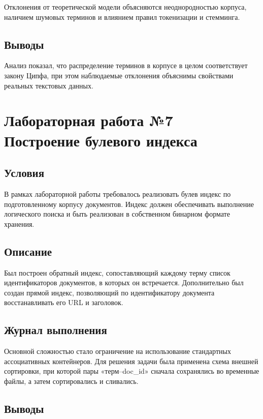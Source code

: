 \documentclass[12pt,a4paper]{article}
\begin{document}
Отклонения от теоретической модели объясняются неоднородностью корпуса, наличием шумовых терминов и влиянием правил токенизации и стемминга.

\subsection*{Выводы}

Анализ показал, что распределение терминов в корпусе в целом соответствует закону Ципфа, при этом наблюдаемые отклонения объяснимы свойствами реальных текстовых данных.

\newpage
\section*{Лабораторная работа №7\\
Построение булевого индекса}

\subsection*{Условия}

В рамках лабораторной работы требовалось реализовать булев индекс по подготовленному корпусу документов. Индекс должен обеспечивать выполнение логического поиска и быть реализован в собственном бинарном формате хранения.

\subsection*{Описание}

Был построен обратный индекс, сопоставляющий каждому терму список идентификаторов документов, в которых он встречается. Дополнительно был создан прямой индекс, позволяющий по идентификатору документа восстанавливать его URL и заголовок.

\subsection*{Журнал выполнения}

Основной сложностью стало ограничение на использование стандартных ассоциативных контейнеров. Для решения задачи была применена схема внешней сортировки, при которой пары «терм–doc\_id» сначала сохранялись во временные файлы, а затем сортировались и сливались.

\subsection*{Выводы}
\end{document}
